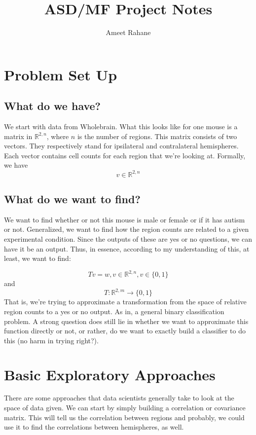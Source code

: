 \documentclass[10.5pt]{article}
\title{ASD/MF Project Notes}
\author{Ameet Rahane}
\def\R{{\mathbb{R}}}
\begin{document}
\maketitle
\date{}
\section{Problem Set Up}

\subsection{What do we have?}
We start with data from Wholebrain. What this looks like for one mouse is a matrix in $\R^{2, n}$, where $n$ is the number of regions. This matrix consists of two vectors. They respectively stand for ipsilateral and contralateral hemispheres. Each vector contains cell counts for each region that we're looking at. Formally, we have
\begin{equation}
v \in \R^{2,n}
\end{equation}
\subsection{What do we want to find?}
We want to find whether or not this mouse is male or female or if it has autism or not. Generalized, we want to find how the region counts are related to a given experimental condition. Since the outputs of these are yes or no questions, we can have it be an output. Thus, in essence, according to my understanding of this, at least, we want to find:

\begin{equation}
Tv = w, v \in \R^{2,n}, v \in \{0,1\}
\end{equation}
and 
\begin{equation}
T: \R^{2,m} \to \{0,1\}
\end{equation}
That is, we're trying to approximate a transformation from the space of relative region counts to a yes or no output. As in, a general binary classification problem. A strong question does still lie in whether we want to approximate this function directly or not, or rather, do we want to exactly build a classifier to do this (no harm in trying right?). 

\section{Basic Exploratory Approaches}
There are some approaches that data scientists generally take to look at the space of data given. We can start by simply building a correlation or covariance matrix. This will tell us the correlation between regions and probably, we could use it to find the correlations between hemispheres, as well. \\
\end{document}
